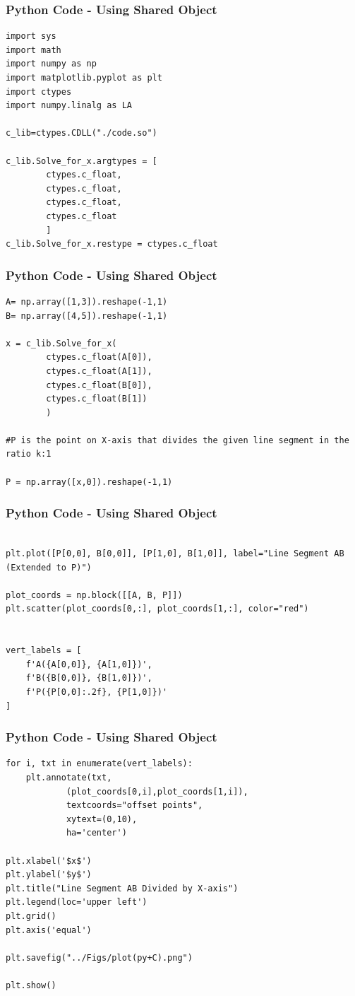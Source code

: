 \documentclass{beamer}
\begin{document}
\begin{frame}[fragile]
    \frametitle{Python Code - Using Shared Object}
    \begin{lstlisting}
import sys
import math
import numpy as np
import matplotlib.pyplot as plt
import ctypes
import numpy.linalg as LA

c_lib=ctypes.CDLL("./code.so")

c_lib.Solve_for_x.argtypes = [
        ctypes.c_float,
        ctypes.c_float,
        ctypes.c_float,
        ctypes.c_float
        ]
c_lib.Solve_for_x.restype = ctypes.c_float
\end{lstlisting}
\end{frame}

\begin{frame}[fragile]
    \frametitle{Python Code - Using Shared Object}
    \begin{lstlisting}
A= np.array([1,3]).reshape(-1,1)
B= np.array([4,5]).reshape(-1,1)

x = c_lib.Solve_for_x(
        ctypes.c_float(A[0]),
        ctypes.c_float(A[1]),
        ctypes.c_float(B[0]),
        ctypes.c_float(B[1])
        )

#P is the point on X-axis that divides the given line segment in the ratio k:1

P = np.array([x,0]).reshape(-1,1)

\end{lstlisting}
\end{frame}

\begin{frame}[fragile]
    \frametitle{Python Code - Using Shared Object}
    \begin{lstlisting}
    
plt.plot([P[0,0], B[0,0]], [P[1,0], B[1,0]], label="Line Segment AB (Extended to P)")

plot_coords = np.block([[A, B, P]])
plt.scatter(plot_coords[0,:], plot_coords[1,:], color="red")


vert_labels = [
    f'A({A[0,0]}, {A[1,0]})',
    f'B({B[0,0]}, {B[1,0]})',
    f'P({P[0,0]:.2f}, {P[1,0]})'
]

\end{lstlisting}
\end{frame}

\begin{frame}[fragile]
    \frametitle{Python Code - Using Shared Object}
    \begin{lstlisting}
for i, txt in enumerate(vert_labels):
    plt.annotate(txt,
            (plot_coords[0,i],plot_coords[1,i]),
            textcoords="offset points",
            xytext=(0,10),
            ha='center')

plt.xlabel('$x$')
plt.ylabel('$y$')
plt.title("Line Segment AB Divided by X-axis")
plt.legend(loc='upper left')
plt.grid()
plt.axis('equal')

plt.savefig("../Figs/plot(py+C).png")

plt.show()
\end{lstlisting}
\end{frame}
\end{document}
